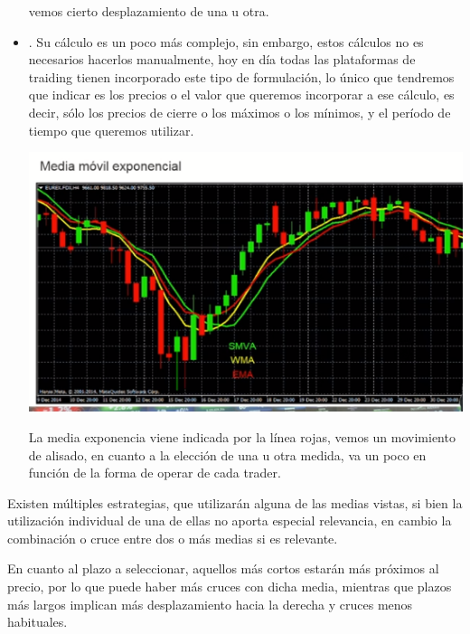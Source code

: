 \begin{itemize}
\begin{center}
    \end{center}
    vemos cierto desplazamiento de una u otra.
    \item {}. Su cálculo es un poco más complejo, sin embargo, estos cálculos no es necesarios hacerlos manualmente, hoy en día todas las plataformas de traiding tienen incorporado este tipo de formulación, lo único que tendremos que indicar es los precios o el valor que queremos incorporar a ese cálculo, es decir, sólo los precios de cierre o los máximos o los mínimos, y el período de tiempo que queremos utilizar.
    \begin{center}
        \includegraphics[scale=.80]{images/medmovexp.png}
    \end{center}
    La media exponencia viene indicada por la línea rojas, vemos un movimiento de alisado, en cuanto a la elección de una u otra medida, va un poco en función de la forma de operar de cada trader. 
\end{itemize}

Existen múltiples estrategias, que utilizarán alguna de las medias vistas, si bien la utilización individual de una de ellas no aporta especial relevancia, en cambio la combinación o cruce entre dos o más medias si es relevante.

En cuanto al plazo a seleccionar, aquellos más cortos estarán más próximos al precio, por lo que puede haber más cruces con dicha media, mientras que plazos más largos implican más desplazamiento hacia la derecha y cruces menos habituales.

